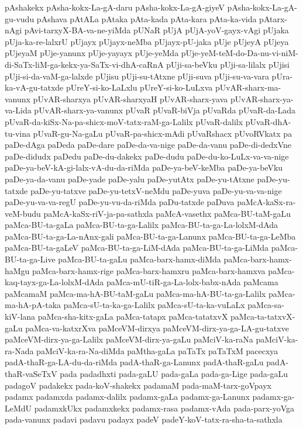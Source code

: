 {pAshakekx
pAsha-kokx-La-gA-daru
pAsha-kokx-La-gA-giyeV
pAsha-kokx-La-gA-gu-vudu
pAshava
pAtALa
pAtaka
pAta-kada
pAta-kara
pAta-ka-vida
pAtarx-nAgi
pAvi-tarxyX-BA-va-ne-yiMda
pUNaR
pUjA
pUjA-yoV-gayx-vAgi
pUjaka
pUja-ka-re-lalxrU
pUjayx
pUjayx-neMba
pUjayx-pU-jaka
pUje
pUjeyA
pUjeya
pUjeyaM
pUje-yanunx
pUje-yayayx
pUje-yeMda
pUje-yeM-teM-do-Da-nu-vi-niM-di-SaTx-liM-ga-kekx-ya-SaTx-vi-dhA-caRnA
pUji-sa-beVku
pUji-sa-lilalx
pUjisi
pUji-si-da-vaM-ga-lalxde
pUjisu
pUji-su-tAtxne
pUji-suva
pUji-su-va-vara
pUra-ka-vA-gu-tatxde
pUreY-si-ko-LaLxlu
pUreY-si-ko-LuLxva
pUvAR-sharx-ma-vanunx
pUvAR-sharxya
pUvAR-sharxyaH
pUvAR-sharx-yava
pUvAR-sharx-ya-va-Lida
pUvAR-sharx-ya-vanunx
pUvaR
pUvaR-biVja
pUvaRda
pUvaR-da-Lada
pUvaR-da-kiSx-Na-pa-shicx-moV-tatx-raM-ga-Lalilx
pUvaR-dalilx
pUvaR-dhA-tu-vina
pUvaR-gu-Na-gaLu
pUvaR-pa-shicx-mAdi
pUvaRshacx
pUvoRVkatx
pa
paDe-dAga
paDeda
paDe-dare
paDe-da-va-nige
paDe-da-vanu
paDe-di-dedxVne
paDe-didudx
paDedu
paDe-du-dakekx
paDe-dudu
paDe-du-ko-LuLx-va-va-nige
paDe-ya-beV-kA-gi-lalx-vA-du-da-riMda
paDe-ya-beV-keMba
paDe-ya-beVku
paDe-ya-da-vanu
paDe-yade
paDe-yalu
paDe-yutAtx
paDe-yu-tAtxne
paDe-yu-tatxde
paDe-yu-tatxve
paDe-yu-tetxV-neMdu
paDe-yuva
paDe-yu-va-va-nige
paDe-yu-va-va-regU
paDe-yu-vu-da-riMda
paDu-tatxde
paDuva
paMcA-kaSx-ra-veM-budu
paMcA-kaSx-riV-ja-pa-sathxla
paMcA-vasethx
paMca-BU-taM-gaLu
paMca-BU-ta-gaLa
paMca-BU-ta-ga-Lalilx
paMca-BU-ta-ga-La-lolxM-dAda
paMca-BU-ta-ga-La-nAnx-gali
paMca-BU-ta-ga-Lanunx
paMca-BU-ta-ga-LeMba
paMca-BU-ta-gaLeV
paMca-BU-ta-ga-LiM-dAda
paMca-BU-ta-ga-LiMda
paMca-BU-ta-ga-Live
paMca-BU-ta-gaLu
paMca-barx-hamx-diMda
paMca-barx-hamx-haMgu
paMca-barx-hamx-rige
paMca-barx-hamxru
paMca-barx-hamxva
paMca-kaq-tayx-ga-La-lolxM-dAda
paMca-mU-tiR-ga-La-lolx-babx-nAda
paMcama
paMcamaM
paMca-ma-hA-BU-taM-gaLu
paMca-ma-hA-BU-ta-ga-Lalilx
paMca-ma-hA-pA-taka
paMca-sU-ta-ka-ga-Lalilx
paMca-sU-ta-ka-vuLaLx
paMca-sa-kiV-lana
paMca-sha-kitx-gaLa
paMca-tatapx
paMca-tatatxvX
paMca-ta-tatxvX-gaLu
paMca-va-katxrXva
paMceVM-dirxya
paMceVM-dirx-ya-ga-LA-gu-tatxve
paMceVM-dirx-ya-ga-Lalilx
paMceVM-dirx-ya-gaLu
paMciV-ka-raNa
paMciV-ka-ra-Nada
paMciV-ka-ra-Na-diMda
paMtha-gaLa
paTaTx
paTaTxM
pacecxya
padA-thaR-ga-LA-du-da-riMda
padA-thaR-ga-Lanunx
padA-thaR-gaLu
padA-thaR-vaSeTxV
pada
padadhxti
pada-gaLU
pada-gaLa
pada-ga-Lige
pada-gaLu
padagoV
padakekx
pada-koV-shakekx
padamaM
pada-maM-tarx-goVpayx
padamx
padamxda
padamx-dalilx
padamx-gaLa
padamx-ga-Lanunx
padamx-ga-LeMdU
padamxkUkx
padamxkekx
padamx-rasa
padamx-vAda
pada-parx-yoVga
pada-vanunx
padavi
padavu
padayx
padeV
padeY-koV-tatx-ra-sha-ta-sathxla
}
